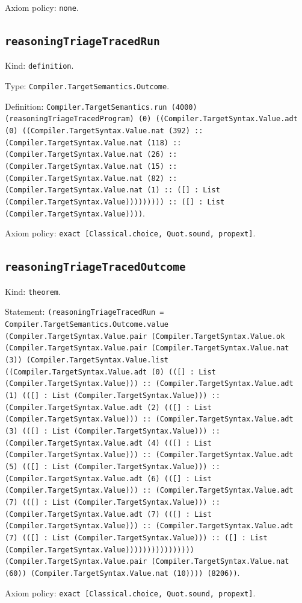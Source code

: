 \documentclass[11pt]{article}
\begin{document}
\noindent Axiom policy: \texttt{none}.\par
\subsection*{\texttt{reasoningTriageTracedRun}}
\noindent Kind: \texttt{definition}.\par
\noindent Type: \texttt{Compiler.TargetSemantics.Outcome}.\par
\noindent Definition: \texttt{Compiler.TargetSemantics.run (4000) (reasoningTriageTracedProgram) (0) ((Compiler.TargetSyntax.Value.adt (0) ((Compiler.TargetSyntax.Value.nat (392) :: (Compiler.TargetSyntax.Value.nat (118) :: (Compiler.TargetSyntax.Value.nat (26) :: (Compiler.TargetSyntax.Value.nat (15) :: (Compiler.TargetSyntax.Value.nat (82) :: (Compiler.TargetSyntax.Value.nat (1) :: ([] : List (Compiler.TargetSyntax.Value))))))))) :: ([] : List (Compiler.TargetSyntax.Value))))}.\par
\noindent Axiom policy: \texttt{exact [Classical.choice, Quot.sound, propext]}.\par
\subsection*{\texttt{reasoningTriageTracedOutcome}}
\noindent Kind: \texttt{theorem}.\par
\noindent Statement: \texttt{(reasoningTriageTracedRun = Compiler.TargetSemantics.Outcome.value (Compiler.TargetSyntax.Value.pair (Compiler.TargetSyntax.Value.ok (Compiler.TargetSyntax.Value.pair (Compiler.TargetSyntax.Value.nat (3)) (Compiler.TargetSyntax.Value.list ((Compiler.TargetSyntax.Value.adt (0) (([] : List (Compiler.TargetSyntax.Value))) :: (Compiler.TargetSyntax.Value.adt (1) (([] : List (Compiler.TargetSyntax.Value))) :: (Compiler.TargetSyntax.Value.adt (2) (([] : List (Compiler.TargetSyntax.Value))) :: (Compiler.TargetSyntax.Value.adt (3) (([] : List (Compiler.TargetSyntax.Value))) :: (Compiler.TargetSyntax.Value.adt (4) (([] : List (Compiler.TargetSyntax.Value))) :: (Compiler.TargetSyntax.Value.adt (5) (([] : List (Compiler.TargetSyntax.Value))) :: (Compiler.TargetSyntax.Value.adt (6) (([] : List (Compiler.TargetSyntax.Value))) :: (Compiler.TargetSyntax.Value.adt (7) (([] : List (Compiler.TargetSyntax.Value))) :: (Compiler.TargetSyntax.Value.adt (7) (([] : List (Compiler.TargetSyntax.Value))) :: (Compiler.TargetSyntax.Value.adt (7) (([] : List (Compiler.TargetSyntax.Value))) :: ([] : List (Compiler.TargetSyntax.Value)))))))))))))))) (Compiler.TargetSyntax.Value.pair (Compiler.TargetSyntax.Value.nat (60)) (Compiler.TargetSyntax.Value.nat (10)))) (8206))}.\par
\noindent Axiom policy: \texttt{exact [Classical.choice, Quot.sound, propext]}.\par
\end{document}
